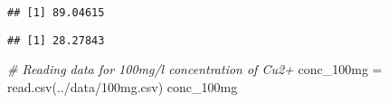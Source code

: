 \documentclass[
]{article}
\newenvironment{Shaded}{\begin{snugshade}}{\end{snugshade}}
\newcommand{\CommentTok}[1]{\textcolor[rgb]{0.56,0.35,0.01}{\textit{#1}}}
\newcommand{\FunctionTok}[1]{\textcolor[rgb]{0.00,0.00,0.00}{#1}}
\newcommand{\NormalTok}[1]{#1}
\newcommand{\OtherTok}[1]{\textcolor[rgb]{0.56,0.35,0.01}{#1}}
\newcommand{\SpecialCharTok}[1]{\textcolor[rgb]{0.00,0.00,0.00}{#1}}
\newcommand{\StringTok}[1]{\textcolor[rgb]{0.31,0.60,0.02}{#1}}
\begin{document}
\begin{verbatim}
## [1] 89.04615
\end{verbatim}

\begin{Shaded}
\end{Shaded}

\begin{verbatim}
## [1] 28.27843
\end{verbatim}

\begin{Shaded}
\begin{Highlighting}[]
\CommentTok{\# Reading data for 100mg/l concentration of Cu2+}
\NormalTok{conc\_100mg }\OtherTok{=} \FunctionTok{read.csv}\NormalTok{(}\StringTok{\textquotesingle{}../data/100mg.csv\textquotesingle{}}\NormalTok{)}
\NormalTok{conc\_100mg}
\end{Highlighting}
\end{Shaded}
\end{document}
